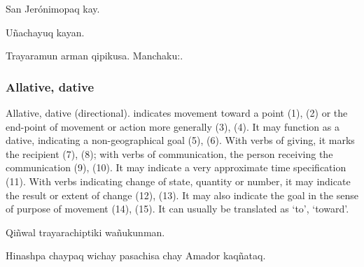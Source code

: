 {%
{San Jer\'onimopaq  kay.}%
{}%
{}{}%

%
{U\~nachayuq kayan.}%
{}%
{}{}%

%
{Trayaramun arman qipikusa. Manchaku:.}%
{}%
{}{}%

\subsubsection{Allative, dative }
Allative, dative (directional).  indicates movement toward a point (1), (2) or the end-point of movement or action more generally (3), (4). It may function as a dative, indicating a non-geographical goal (5), (6). With verbs of giving, it marks the recipient (7), (8); with verbs of communication, the person receiving the communication (9), (10). It may indicate a very approximate time specification (11). With verbs indicating change of state, quantity or number, it may indicate the result or extent of change (12), (13). It may also indicate the goal in the sense of purpose of movement (14), (15). It can usually be translated as `to', `toward'.

%
{Qi\~nwal trayarachiptiki wa\~nukunman.}%
{}%
{}{}%

%
{Hinashpa chaypaq wichay pasachisa chay Amador kaq\~nataq.}%
{}%
{}{}%

}
